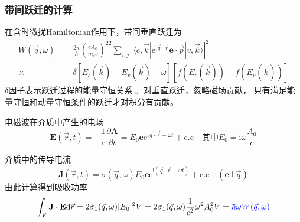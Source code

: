 \documentclass[cjk,slidestop,compress,mathserif,blue]{beamer}
\begin{document}
\frame
{
\frametitle{带间跃迁的计算}
在含时微扰\textrm{Hamiltonian}作用下，带间垂直跃迁为
\begin{displaymath}
	\begin{aligned}
		W(\vec q,\omega)=&\frac{2\pi}{\hbar}\left( \frac{eA_0}{m_ec} \right)^22\sum_{i,j}|\langle c,\vec k|\mathrm{e}^{\mathrm{i}\vec q\cdot\vec r}\mathbf{e}\cdot\vec p|v,\vec k\rangle|^2\\
		\times&\delta[E_c(\vec k)-E_v(\vec k)-\omega][f(E_c(\vec k))-f(E_v(\vec k))]
	\end{aligned}
  \label{eq:optic-27}
\end{displaymath}
$\delta$因子表示跃迁过程的能量守恒关系%
。对垂直跃迁，忽略磁场贡献，%
只有满足能量守恒和动量守恒条件的跃迁才对积分有贡献。%

电磁波在介质中产生的电场
\begin{displaymath}
	\mathbf{E}(\vec r,t)=-\frac1c\frac{\partial\mathbf{A}}{\partial t}=E_0\mathbf{e}\mathrm{e}^{\mathrm{i}\vec q\cdot\vec r-\omega t}+\mathrm{c.c}\quad\mbox{其中}E_0=\mathrm{i}\omega\frac{A_0}c
\end{displaymath}

介质中的传导电流
\begin{displaymath}
	\mathbf{J}(\vec r,t)=\sigma(\vec q,\omega)E_0\mathbf{e}\mathrm{e}^{\mathrm{i}(\vec q\cdot\vec r-\omega t)}+\mathrm{c.c}\quad(\mathbf{e}\bot\vec q)
\end{displaymath}
由此计算得到吸收功率
\begin{displaymath}
	\int_V\mathbf{J}\cdot\mathbf{E}\mathrm{d}\vec r=2\sigma_1(\vec q,\omega)|E_0|^2V=2\sigma_1(\vec q,\omega)\frac1{c^2}\omega^2A_0^2V=\textcolor{blue}{\hbar\omega W(\vec q,\omega)}
\end{displaymath}
}
\end{document}
